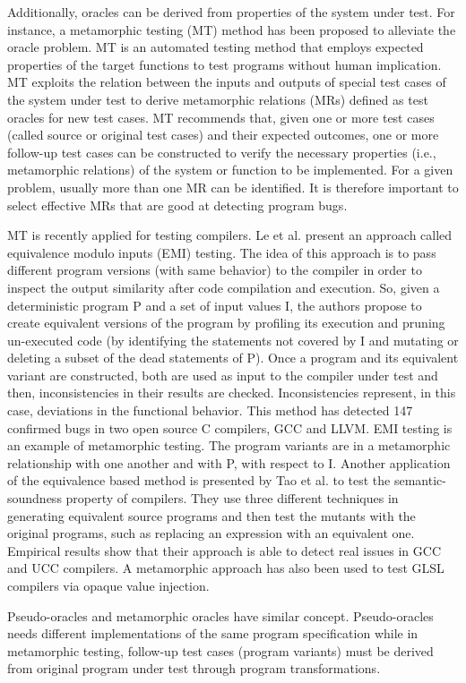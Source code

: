 \begin{itemize}
	Additionally, oracles can be derived from properties of the system under test. For instance, a metamorphic testing (MT) method has been proposed to alleviate the oracle problem\cite{chen2004case}. MT is an automated testing method that employs expected properties of the target functions to test programs without human implication. 
	MT exploits the relation between the inputs and outputs of special test cases of the system under test to derive metamorphic relations (MRs) defined as test oracles for new test cases. 
	MT recommends that, given one or more test cases (called source or original test cases) and their expected outcomes, one or more follow-up test cases can be constructed to verify the necessary properties (i.e., metamorphic relations) of the system or function to be implemented.
	For a given problem, usually more than one MR can be identified. It is therefore important to select effective MRs that are good at detecting program bugs.

	MT is recently applied for testing compilers. Le et al.\cite{le2014compiler} present an approach called equivalence modulo inputs (EMI) testing. The idea of this approach is to pass different program versions (with same behavior) to the compiler in order to inspect the output similarity after code compilation and execution. So, given a deterministic program P and a set of input values I, the authors propose to create equivalent versions of the program by profiling its execution and pruning un-executed code (by identifying the statements not covered by I and mutating or deleting a subset of the dead statements of P).
	Once a program and its equivalent variant are constructed, both are used as input to the compiler under test and then, inconsistencies in their results are checked. Inconsistencies represent, in this case, deviations in the functional behavior.
	This method has detected 147 confirmed bugs in two open source C compilers, GCC and LLVM.
	EMI testing is an example of metamorphic testing. The program variants are in a metamorphic relationship with one another and with P, with respect to I.
	Another application of the equivalence based method is presented by Tao et al.\cite{tao2010automatic} to test the semantic-soundness property of compilers. They use three different techniques in generating equivalent source programs and then test the mutants with the original programs, such as replacing an expression with an equivalent one. Empirical results show that their approach is able to detect real issues in GCC and UCC compilers.
	A metamorphic approach has also been used to test GLSL compilers via opaque value injection\cite{donaldson2016metamorphic}.
	
	Pseudo-oracles and metamorphic oracles have similar concept. Pseudo-oracles needs different implementations of the same program specification while in metamorphic testing, follow-up test cases (program variants) must be derived from original program under test through program transformations.
	

	
	
\end{itemize}


